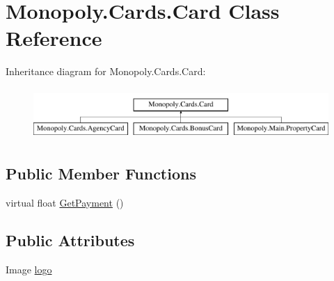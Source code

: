 \hypertarget{class_monopoly_1_1_cards_1_1_card}{}\section{Monopoly.\+Cards.\+Card Class Reference}
\label{class_monopoly_1_1_cards_1_1_card}
Inheritance diagram for Monopoly.\+Cards.\+Card\+:\begin{figure}[H]
\begin{center}
\leavevmode
\includegraphics[height=1.964912cm]{class_monopoly_1_1_cards_1_1_card}
\end{center}
\end{figure}
\subsection*{Public Member Functions}
\begin{DoxyCompactItemize}
\item 
virtual float \mbox{\hyperlink{class_monopoly_1_1_cards_1_1_card_a3a30376e286fdae69bf7c77cd6620fe3}{Get\+Payment}} ()
\end{DoxyCompactItemize}
\subsection*{Public Attributes}
\begin{DoxyCompactItemize}
\item 
Image \mbox{\hyperlink{class_monopoly_1_1_cards_1_1_card_a84da6fc446a55518f9bdf8fa7eef9057}{logo}}
\end{DoxyCompactItemize}
